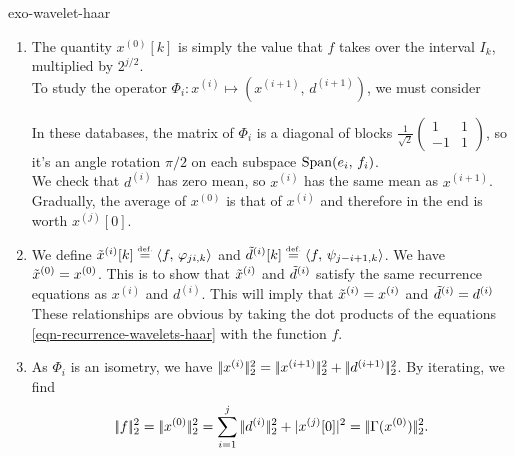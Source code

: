 \begin{correction}{exo-wavelet-haar}
\begin{enumerate}
\item The quantity $ x^{(0)}[k] $ is simply the value that $ f $ takes over the interval $ I_k $, multiplied by $ 2^{j/2} $. \\To study the operator $ \Phi_i: x^{(i)} \mapsto (x^{(i+1)}, \, d^{(i+1)}) $, we must consider  In these databases, the matrix of $ \Phi_i $ is a diagonal of blocks $ \frac{1}{\sqrt{2}} \left(\begin{smallmatrix} 1 & 1 \\-1 & 1 \end{smallmatrix} \right) $, so it's an angle rotation $ \pi/2 $ on each subspace $ \operatorname{Span} (e_i, \, f_i) $. \\We check that $ d^{(i)} $ has zero mean, so $ x^{(i)} $ has the same mean as $ x^{(i+1)} $. Gradually, the average of $ x^{(0)} $ is that of $ x^{(i)} $ and therefore in the end is worth $ x^{(j)}[0] $.
\item We define $ \tilde{x}^{(i)}[k] \stackrel{\mbox{\upshape\tiny def.}}{=} \langle f,\,\varphi_{ji, k}\rangle $ and $ \tilde{d}^{(i)}[k] \stackrel{\mbox{\upshape\tiny def.}}{=} \langle f,\,\psi_{j-i+1, k}\rangle $. We have $ \tilde{x}^{(0)} = x^{(0)} $. This is to show that $ \tilde{x}^{(i)} $ and $ \tilde{d}^{(i)} $ satisfy the same recurrence equations as $ x^{(i)} $ and $ d^{(i)} $. This will imply that $ \tilde{x}^{(i)} = x^{(i)} $ and $ \tilde{d}^{(i)} = d^{(i)} $ These relationships are obvious by taking the dot products of the equations \eqref{eqn-recurrence-wavelets-haar} with the function $ f $.
\item As $ \Phi_i $ is an isometry, we have $ |\!| x^{(i)} |\!|_2^2 = |\!| x^{(i+1)} |\!|_2^2 + |\!| d^{(i+1)} |\!|_2^2 $. By iterating, we find
\begin{equation*}
\norm{f}_2^2 = \norm{x^{(0)}}_2^2 = \sum_{i = 1}^j{\norm{d^{(i)}}_2^2 + | x^{(j)}[0] |^2} = \norm{\Gamma (x^{(0)})}_2^2.
\end{equation*}

\end{enumerate}
\end{correction}
